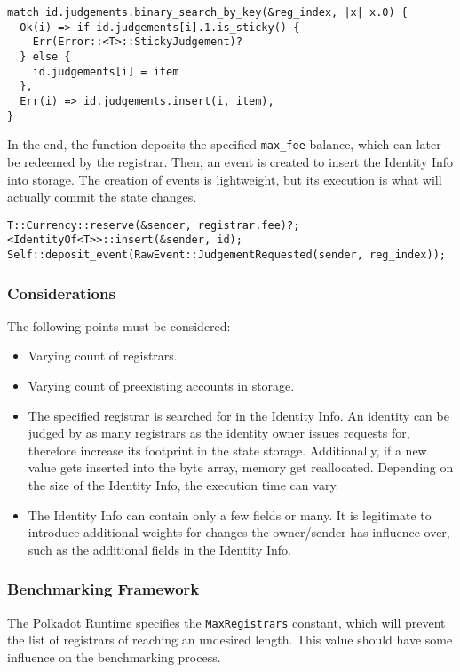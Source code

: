 \documentclass[11pt,a4paper]{article}
\begin{document}
\begin{verbatim}
match id.judgements.binary_search_by_key(&reg_index, |x| x.0) {
  Ok(i) => if id.judgements[i].1.is_sticky() {
    Err(Error::<T>::StickyJudgement)?
  } else {
    id.judgements[i] = item
  },
  Err(i) => id.judgements.insert(i, item),
}
\end{verbatim}

In the end, the function deposits the specified \verb|max_fee| balance, which
can later be redeemed by the registrar. Then, an event is created to insert the
Identity Info into storage. The creation of events is lightweight, but its
execution is what will actually commit the state changes.

\begin{verbatim}
T::Currency::reserve(&sender, registrar.fee)?;
<IdentityOf<T>>::insert(&sender, id);
Self::deposit_event(RawEvent::JudgementRequested(sender, reg_index));
\end{verbatim}

\subsubsection{Considerations}

The following points must be considered:

\begin{itemize}
  \item Varying count of registrars.
  \item Varying count of preexisting accounts in storage.
  \item The specified registrar is searched for in the Identity Info. An
  identity can be judged by as many registrars as the identity owner issues
  requests for, therefore increase its footprint in the state storage.
  Additionally, if a new value gets inserted into the byte array, memory get
  reallocated. Depending on the size of the Identity Info, the execution time
  can vary.
  \item The Identity Info can contain only a few fields or many. It is
  legitimate to introduce additional weights for changes the owner/sender has
  influence over, such as the additional fields in the Identity Info.
\end{itemize}

\subsubsection{Benchmarking Framework}

The Polkadot Runtime specifies the \verb|MaxRegistrars| constant, which will
prevent the list of registrars of reaching an undesired length. This value
should have some influence on the benchmarking process.
\newline
\end{document}
